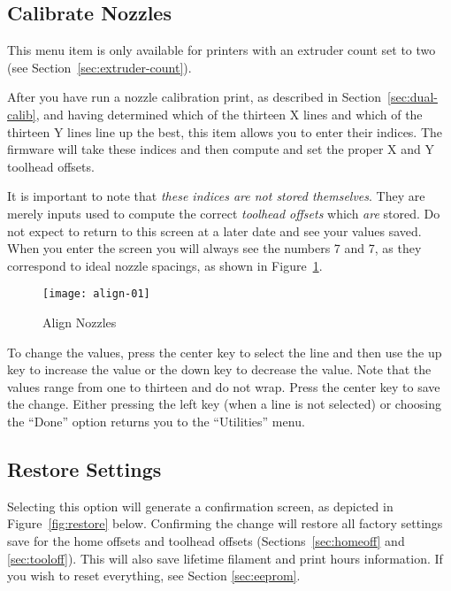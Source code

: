 
\subsection{Calibrate Nozzles} \label{sec:calibnozz}
This menu item is only available for printers with an extruder count set to two (see Section~\ref{sec:extruder-count}).

After you have run a nozzle calibration print, as described in Section~\ref{sec:dual-calib}, and having determined which of the thirteen X lines and which of the thirteen Y lines line up the best, this item allows you to enter their indices.  The firmware will take these indices and then compute and set the proper X and Y toolhead offsets.

It is important to note that \emph{these indices are not stored themselves}.  They are merely inputs used to compute the correct \emph{toolhead offsets} which \emph{are} stored.  Do not expect to return to this screen at a later date and see your values saved.  When you enter the screen you will always see the numbers 7 and 7, as they correspond to ideal nozzle spacings, as shown in Figure~\ref{fig:alignnozzles}.

\begin{figure}[!htbp]
  \centering
    \texttt{[image: align-01]}
    \caption{Align Nozzles}
  \label{fig:alignnozzles}
\end{figure}

To change the values, press the center key to select the line and then use the up key to increase the value or the down key to decrease the value.  Note that the values range from one to thirteen and do not wrap.  Press the center key to save the change.  Either pressing the left key (when a line is not selected) or choosing the ``Done'' option returns you to the ``Utilities'' menu.


\subsection{Restore Settings} \label{sec:restore-settings}

Selecting this option will generate a confirmation screen, as depicted in Figure~\ref{fig:restore} below.  Confirming the change will restore all factory settings save for the home offsets and toolhead offsets (Sections~\ref{sec:homeoff} and \ref{sec:tooloff}).  This will also save lifetime filament and print hours information.  If you wish to reset everything, see Section \ref{sec:eeprom}.

